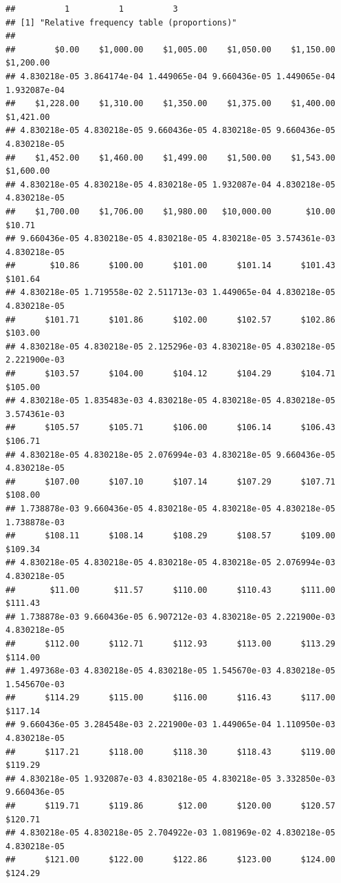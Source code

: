 \begin{verbatim}
##          1          1          3 
## [1] "Relative frequency table (proportions)"
## 
##        $0.00    $1,000.00    $1,005.00    $1,050.00    $1,150.00    $1,200.00 
## 4.830218e-05 3.864174e-04 1.449065e-04 9.660436e-05 1.449065e-04 1.932087e-04 
##    $1,228.00    $1,310.00    $1,350.00    $1,375.00    $1,400.00    $1,421.00 
## 4.830218e-05 4.830218e-05 9.660436e-05 4.830218e-05 9.660436e-05 4.830218e-05 
##    $1,452.00    $1,460.00    $1,499.00    $1,500.00    $1,543.00    $1,600.00 
## 4.830218e-05 4.830218e-05 4.830218e-05 1.932087e-04 4.830218e-05 4.830218e-05 
##    $1,700.00    $1,706.00    $1,980.00   $10,000.00       $10.00       $10.71 
## 9.660436e-05 4.830218e-05 4.830218e-05 4.830218e-05 3.574361e-03 4.830218e-05 
##       $10.86      $100.00      $101.00      $101.14      $101.43      $101.64 
## 4.830218e-05 1.719558e-02 2.511713e-03 1.449065e-04 4.830218e-05 4.830218e-05 
##      $101.71      $101.86      $102.00      $102.57      $102.86      $103.00 
## 4.830218e-05 4.830218e-05 2.125296e-03 4.830218e-05 4.830218e-05 2.221900e-03 
##      $103.57      $104.00      $104.12      $104.29      $104.71      $105.00 
## 4.830218e-05 1.835483e-03 4.830218e-05 4.830218e-05 4.830218e-05 3.574361e-03 
##      $105.57      $105.71      $106.00      $106.14      $106.43      $106.71 
## 4.830218e-05 4.830218e-05 2.076994e-03 4.830218e-05 9.660436e-05 4.830218e-05 
##      $107.00      $107.10      $107.14      $107.29      $107.71      $108.00 
## 1.738878e-03 9.660436e-05 4.830218e-05 4.830218e-05 4.830218e-05 1.738878e-03 
##      $108.11      $108.14      $108.29      $108.57      $109.00      $109.34 
## 4.830218e-05 4.830218e-05 4.830218e-05 4.830218e-05 2.076994e-03 4.830218e-05 
##       $11.00       $11.57      $110.00      $110.43      $111.00      $111.43 
## 1.738878e-03 9.660436e-05 6.907212e-03 4.830218e-05 2.221900e-03 4.830218e-05 
##      $112.00      $112.71      $112.93      $113.00      $113.29      $114.00 
## 1.497368e-03 4.830218e-05 4.830218e-05 1.545670e-03 4.830218e-05 1.545670e-03 
##      $114.29      $115.00      $116.00      $116.43      $117.00      $117.14 
## 9.660436e-05 3.284548e-03 2.221900e-03 1.449065e-04 1.110950e-03 4.830218e-05 
##      $117.21      $118.00      $118.30      $118.43      $119.00      $119.29 
## 4.830218e-05 1.932087e-03 4.830218e-05 4.830218e-05 3.332850e-03 9.660436e-05 
##      $119.71      $119.86       $12.00      $120.00      $120.57      $120.71 
## 4.830218e-05 4.830218e-05 2.704922e-03 1.081969e-02 4.830218e-05 4.830218e-05 
##      $121.00      $122.00      $122.86      $123.00      $124.00      $124.29 

\end{verbatim}
